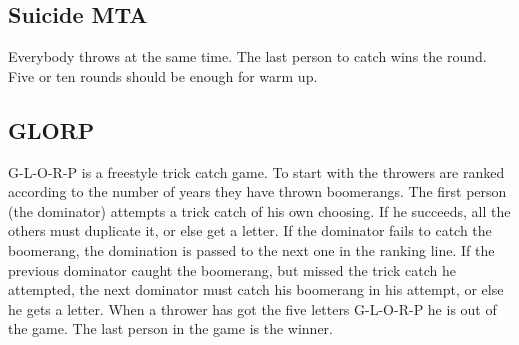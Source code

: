 \subsection{Suicide MTA}
Everybody throws at the same time. The last person to catch wins the round.
Five or ten rounds should be enough for warm up.

\subsection{GLORP}
G-L-O-R-P is a freestyle trick catch game. To start with the throwers are ranked according to the number of years they have thrown boomerangs. The first person (the dominator) attempts a trick catch of his own choosing. If he succeeds, all the others must duplicate it, or else get a letter. If the dominator fails to catch the boomerang, the domination is passed to the next one in the ranking line. If the previous dominator caught the boomerang, but missed the trick catch he attempted, the next dominator must catch his boomerang in his attempt, or else he gets a letter. When a thrower has got the five letters G-L-O-R-P he is out of the game. The last person in the game is the winner.
 
 
 
